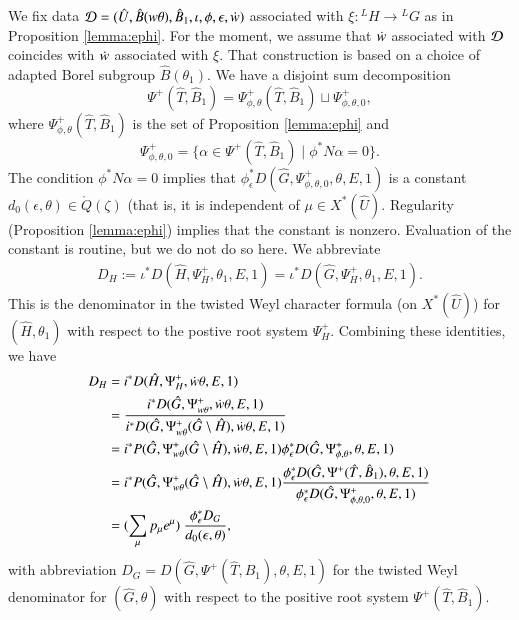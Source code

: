 We fix data $\mathcal D=(\hat U,\hat B(w\theta),\hat B_1,\iota,\phi,\epsilon,\dot w)$ associated with
$\xi:{}^LH\to{}^LG$ as in Proposition \ref{lemma:ephi}.  
For the moment, we assume that $\dot w$ associated with $\mathcal D$ coincides
with
$\dot w$ associated with $\xi$.
That
construction is based on a choice of adapted Borel subgroup
$\hat B(\theta_1)$.  
We have a
disjoint sum decomposition 
\[
\Psi^+(\hat T,\hat B_1) = \Psi_{\phi,\theta}^+(\hat T,\hat B_1)\sqcup \Psi_{\phi,\theta,0}^+,
\]
where $\Psi_{\phi,\theta}^+(\hat T,\hat B_1)$ is the set of Proposition \ref{lemma:ephi} and
\[
\Psi_{\phi,\theta,0}^+ = \{\alpha\in \Psi^+(\hat T,\hat B_1)\mid \phi^* N\alpha=0\}.
\]
The condition $\phi^* N\alpha=0$ implies that
$\phi^*_\epsilon D(\hat G,\Psi_{\phi,\theta,0}^+,\theta,E,1)$ is a
constant $d_0(\epsilon,\theta)\in\ring{Q}(\zeta)$ (that is, it is independent
of $\mu\in X^*(\hat U)$.  Regularity (Proposition \ref{lemma:ephi})
implies that the constant is nonzero.  Evaluation of the constant is
routine, but we do not do so here.  We abbreviate
\begin{align*}
D_H := \iota^* D(\hat H,\Psi^+_H,\theta_1,E,1) = \iota^* D(\hat G,\Psi^+_H,\theta_1,E,1).
\end{align*}
This is the denominator in the twisted Weyl character formula (on
$X^*(\hat U)$) for $(\hat H,\theta_1)$
with respect to the postive root system $\Psi^+_H$.
Combining these identities, we have
\begin{align}\label{eqn:DHDG}
\begin{split}
D_H &= i^* D(\hat H,\Psi^+_H,\dot w\theta,E,1)\\
&=\frac{i^*D(\hat G,\Psi_{w\theta}^+,\dot w\theta,E,1)}
{i^*D(\hat G,\Psi_{w\theta}^+(\hat G\setminus\hat H),\dot w\theta,E,1)}\\
&=
{i^*P(\hat G,\Psi_{w\theta}^+(\hat G\setminus\hat H),\dot w\theta,E,1)}
\phi^*_\epsilon D(\hat G,\Psi_{\phi,\theta}^+,\theta,E,1)\\
&=
{i^*P(\hat G,\Psi_{w\theta}^+(\hat G\setminus\hat H),\dot w\theta,E,1)}
\frac{\phi^*_\epsilon D(\hat G,\Psi^+(\hat T,\hat B_1),\theta,E,1)}
{\phi^*_\epsilon D(\hat G,\Psi_{\phi,\theta,0}^+,\theta,E,1)}\\
&=
(\sum_{\mu} p_\mu e^\mu) 
\ \frac{\phi^*_\epsilon D_G}{
d_0(\epsilon,\theta)},
\end{split}
\end{align}
with abbreviation $D_G= D(\hat G,\Psi^+(\hat T,\hat B_1),\theta,E,1)$ for
the twisted Weyl denominator for $(\hat G,\theta)$ with respect to the positive
root system $\Psi^+(\hat T,\hat B_1)$.


